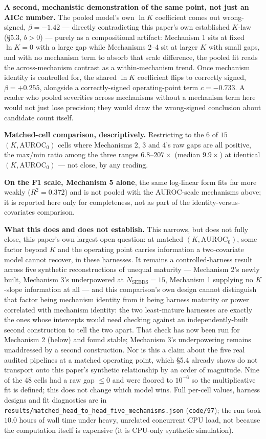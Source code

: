 \documentclass[10pt]{article} %
\begin{document}
\textbf{A second, mechanistic demonstration of the same point, not just an
AICc number.} The pooled model's own $\ln K$ coefficient comes out
wrong-signed, $\beta=-1.42$ --- directly contradicting this paper's own
established $K$-law (§5.3, $b>0$) --- purely as a compositional artifact:
Mechanism 1 sits at fixed $\ln K=0$ with a large gap while Mechanisms 2--4
sit at larger $K$ with small gaps, and with no mechanism term to absorb that
scale difference, the pooled fit reads the across-mechanism contrast as a
within-mechanism trend. Once mechanism identity is controlled for, the shared
$\ln K$ coefficient flips to correctly signed, $\beta=+0.255$, alongside a
correctly-signed operating-point term $c=-0.733$. A reader who pooled
severities across mechanisms without a mechanism term here would not just
lose precision; they would draw the wrong-signed conclusion about candidate
count itself.

\textbf{Matched-cell comparison, descriptively.} Restricting to the $6$ of
$15$ $(K,\text{AUROC}_0)$ cells where Mechanisms 2, 3 and 4's raw gaps are all
positive, the max/min ratio among the three ranges $6.8$--$207\times$ (median
$9.9\times$) at identical $(K,\text{AUROC}_0)$ --- not close, by any reading.

\textbf{On the F1 scale, Mechanism 5 alone}, the same log-linear form fits far
more weakly ($R^2=0.372$) and is not pooled with the AUROC-scale mechanisms
above; it is reported here only for completeness, not as part of the
identity-versus-covariates comparison.

\textbf{What this does and does not establish.} This narrows, but does not
fully close, this paper's own largest open question: at matched
$(K,\text{AUROC}_0)$, some factor beyond $K$ and the operating point carries
information a two-covariate model cannot recover, in these harnesses. It
remains a controlled-harness result across five synthetic reconstructions of
unequal maturity --- Mechanism 2's newly built, Mechanism 3's underpowered at
$N_{\text{SEEDS}}=15$, Mechanism 1 supplying no $K$-slope information at all
--- and this comparison's own design cannot distinguish that factor being
mechanism identity from it being harness maturity or power correlated with
mechanism identity: the two least-mature harnesses are exactly the ones
whose intercepts would need checking against an independently-built second
construction to tell the two apart. That check has now been run for
Mechanism 2 (below) and found stable; Mechanism 3's underpowering remains
unaddressed by a second construction. Nor is this a claim about the five
real audited pipelines at a matched operating point, which §5.4 already
shows do not transport onto this paper's synthetic relationship by an order
of magnitude. Nine of the $48$ cells had a raw gap $\leq0$ and were floored
to $10^{-6}$ so the multiplicative fit is defined; this does not change
which model wins. Full per-cell values, harness designs and fit diagnostics
are in \texttt{results/matched\_head\_to\_head\_five\_mechanisms.json}
(\texttt{code/97}); the run took $10.0$ hours of wall time under heavy,
unrelated concurrent CPU load, not because the computation itself is
expensive (it is CPU-only synthetic simulation).
\end{document}
